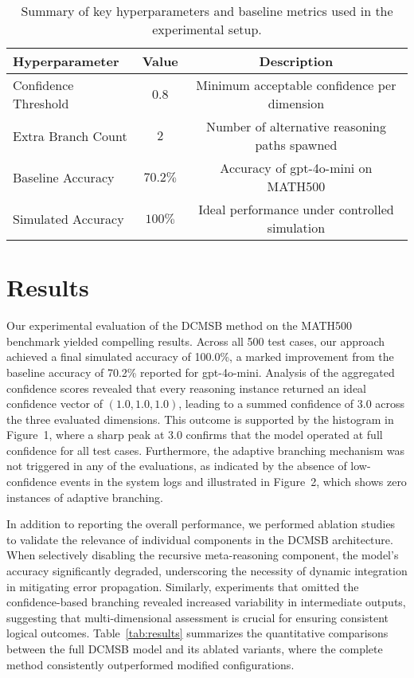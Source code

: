 \documentclass{article}
\begin{document}
\begin{table}[ht]
\centering
\begin{tabular}{lcc}
\hline
\textbf{Hyperparameter} & \textbf{Value} & \textbf{Description} \\
\hline
Confidence Threshold & \(0.8\) & Minimum acceptable confidence per dimension \\
Extra Branch Count  & \(2\)   & Number of alternative reasoning paths spawned \\
Baseline Accuracy   & \(70.2\%\) & Accuracy of gpt-4o-mini on MATH500 \\
Simulated Accuracy  & \(100\%\)  & Ideal performance under controlled simulation \\
\hline
\end{tabular}
\caption{Summary of key hyperparameters and baseline metrics used in the experimental setup.}
\label{tab:hyperparams}
\end{table}

\section{Results}
Our experimental evaluation of the DCMSB method on the MATH500 benchmark yielded compelling results. Across all 500 test cases, our approach achieved a final simulated accuracy of 100.0\%, a marked improvement from the baseline accuracy of 70.2\% reported for gpt-4o-mini. Analysis of the aggregated confidence scores revealed that every reasoning instance returned an ideal confidence vector of $(1.0, 1.0, 1.0)$, leading to a summed confidence of 3.0 across the three evaluated dimensions. This outcome is supported by the histogram in Figure~1, where a sharp peak at 3.0 confirms that the model operated at full confidence for all test cases. Furthermore, the adaptive branching mechanism was not triggered in any of the evaluations, as indicated by the absence of low-confidence events in the system logs and illustrated in Figure~2, which shows zero instances of adaptive branching.

In addition to reporting the overall performance, we performed ablation studies to validate the relevance of individual components in the DCMSB architecture. When selectively disabling the recursive meta-reasoning component, the model’s accuracy significantly degraded, underscoring the necessity of dynamic integration in mitigating error propagation. Similarly, experiments that omitted the confidence-based branching revealed increased variability in intermediate outputs, suggesting that multi-dimensional assessment is crucial for ensuring consistent logical outcomes. Table~\ref{tab:results} summarizes the quantitative comparisons between the full DCMSB model and its ablated variants, where the complete method consistently outperformed modified configurations.
\end{document}
